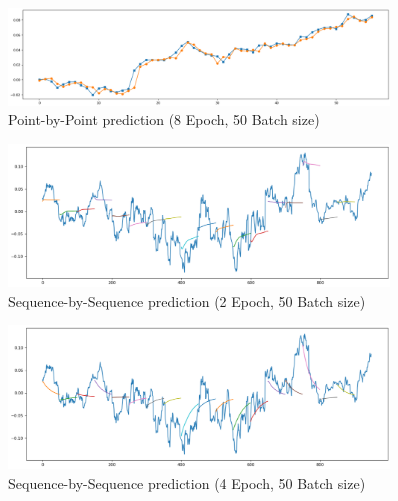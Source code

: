 \begin{figure}[htpb]
\begin{center}
\includegraphics[width=0.9\textwidth]{./figs/PP_8_50.PNG}
\vspace{-0.2cm}
\caption{Point-by-Point prediction (8 Epoch, 50 Batch size)}
\label{fig_predict}
\end{center}
\vspace{-0.6cm}
\end{figure}

\begin{figure}[htpb]
\begin{center}
\includegraphics[width=0.9\textwidth]{./figs/SS_2_50.PNG}
\vspace{-0.2cm}
\caption{Sequence-by-Sequence prediction (2 Epoch, 50 Batch size)}
\label{fig_predict}
\end{center}
\vspace{-0.6cm}
\end{figure}

\begin{figure}[htpb]
\begin{center}
\includegraphics[width=0.9\textwidth]{./figs/SS_4_50.PNG}
\vspace{-0.2cm}
\caption{Sequence-by-Sequence prediction (4 Epoch, 50 Batch size)}
\label{fig_predict}
\end{center}
\vspace{-0.6cm}
\end{figure}


